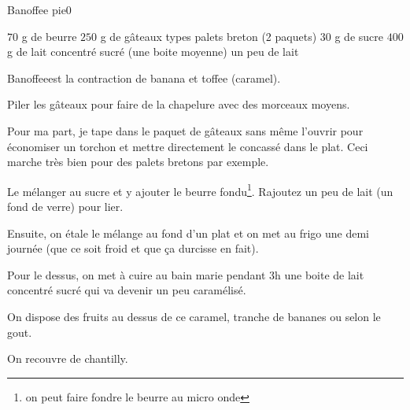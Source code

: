 \begin{recette}{Banoffee pie}{0}{}{}
\begin{ingredients}
\ingredient $70$ g de beurre
\ingredient $250$ g de gâteaux types palets breton (2 paquets)
\ingredient $30$ g de sucre
\ingredient $400$ g de lait concentré sucré (une boite moyenne)
\ingredient un peu de lait
\end{ingredients}

\begin{remarque}
\og Banoffee\fg est la contraction de banana et toffee (caramel).
\end{remarque}

\begin{preparation}
\etape Piler les gâteaux pour faire de la chapelure avec des morceaux moyens.

\begin{remarque}
Pour ma part, je tape dans le paquet de gâteaux sans même l'ouvrir pour économiser un torchon et mettre directement le concassé dans le plat. Ceci marche très bien pour des palets bretons par exemple.
\end{remarque}

\etape Le mélanger au sucre et y ajouter le beurre fondu\footnote{on peut faire fondre le beurre au micro onde}. Rajoutez un peu de lait (un fond de verre) pour lier.

\etape Ensuite, on étale le mélange au fond d'un plat et on met au frigo une demi journée (que ce soit froid et que ça durcisse en fait).

\etape Pour le dessus, on met à cuire au bain marie pendant 3h une boite de lait concentré sucré qui va devenir un peu caramélisé.

\etape On dispose des fruits au dessus de ce caramel, tranche de bananes ou selon le gout.

\etape On recouvre de chantilly.
\end{preparation}

\end{recette}

